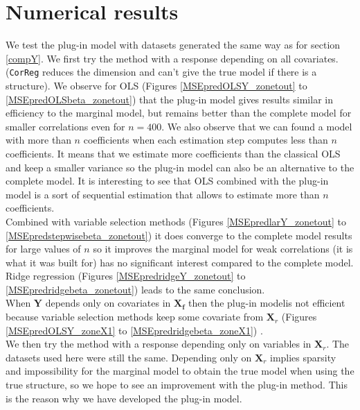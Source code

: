 \documentclass[12pt,a4paper]{report}
\begin{document}
	\section{Numerical results}
		We test the plug-in model with datasets generated the same way as for section \ref{compY}.
We first try the method with a response depending on all covariates. ({\tt CorReg} reduces the dimension and can't give the true model if there is a structure). We observe for OLS (Figures \ref{MSEpredOLSY_zonetout} to \ref{MSEpredOLSbeta_zonetout}) that the plug-in model gives results similar in efficiency to the marginal model, but remains better than the complete model for smaller  correlations even for $n=400$. We also observe that we can found a model with more than $n$ coefficients when each estimation step computes less than $n$ coefficients. It means that  we estimate more coefficients than the classical OLS and keep a smaller variance so the plug-in model can also be an alternative to the complete model. It is interesting to see that OLS combined with the plug-in model is a sort of sequential estimation that allows to estimate more than $n$ coefficients.\\
 
 
Combined with variable selection methods (Figures \ref{MSEpredlarY_zonetout} to \ref{MSEpredstepwisebeta_zonetout}) it does converge to the complete model results for large values of $n$ so it improves the marginal model for weak correlations (it is what it was built for) has no significant interest compared to the complete model. Ridge regression (Figures \ref{MSEpredridgeY_zonetout} to \ref{MSEpredridgebeta_zonetout}) leads to the same conclusion. \\
 
When $\boldsymbol{Y}$ depends only on covariates in $\boldsymbol{X_f}$	 then the plug-in modelis not efficient because variable selection methods keep some covariate from $\boldsymbol{X}_r$ (Figures \ref{MSEpredOLSY_zoneX1} to \ref{MSEpredridgebeta_zoneX1}) \label{tableMSEsimdroitepred}.\\

	
	 \label{tableMSEsimgauchepred}
We then try the method with a response depending only on variables in $\boldsymbol{X}_r$. The datasets used here were still the same.
Depending only on $\boldsymbol{X}_r$ implies sparsity and impossibility for the marginal model to obtain the true model when using the true structure, so we hope to see an improvement with the plug-in method. This is the reason why we have developed the plug-in model. \\
\end{document}
